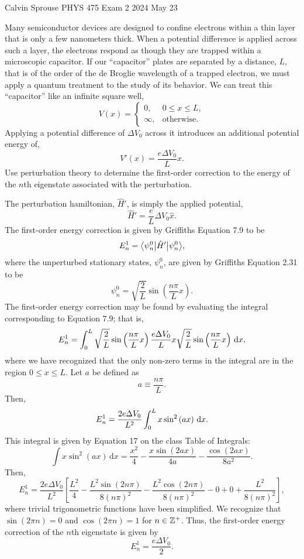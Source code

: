 \documentclass[a4paper, 12pt]{config/homework}
\begin{document}
\noindent
Calvin Sprouse \hfill PHYS 475 Exam 2 \hfill 2024 May 23
\bigskip

\noindent
Many semiconductor devices are designed to confine electrons within a thin layer that is only a few nanometers thick. When a potential difference is applied across such a layer, the electrons respond as though they are trapped within a microscopic capacitor. If our ``capacitor'' plates are separated by a distance, \(L\), that is of the order of the de Broglie wavelength of a trapped electron, we must apply a quantum treatment to the study of its behavior. We can treat this ``capacitor'' like an infinite square well,
\[V(x) = \begin{cases}
0, & 0 \le x \le L, \\
\infty, & \text{otherwise}.
\end{cases}\]
Applying a potential difference of \(\Delta V_0\) across it introduces an additional potential energy of,
\[V'(x) = \frac{e\Delta V_0}{L}x.\]
Use perturbation theory to determine the first-order correction to the energy of the \(n\)th eigenstate associated with the perturbation.

\bigskip\noindent
The perturbation hamiltonian, \(\hat{H}'\), is simply the applied potential,
\[\hat{H}' = \frac{e}{L}\Delta V_0 \hat{x}.\]
The first-order energy correction is given by Griffiths Equation 7.9 to be
\[E_n^1 = \bra*{\psi^0_n}\hat{H}'\ket*{\psi^0_n},\]
where the unperturbed stationary states, \(\psi_n^0\), are given by Griffiths Equation 2.31 to be
\[\psi_n^0 = \sqrt{\frac{2}{L}}\sin\left(\frac{n\pi}{L}x\right).\]
The first-order energy correction may be found by evaluating the integral corresponding to Equation 7.9; that is,
\[E_n^1 = \int_{0}^{L}{\sqrt{\frac{2}{L}}\sin\left(\frac{n\pi}{L}x\right) \frac{e\Delta V_0}{L}x \sqrt{\frac{2}{L}}\sin\left(\frac{n\pi}{L}x\right)\,\text{d}x},\]
where we have recognized that the only non-zero terms in the integral are in the region \(0\le x \le L\). Let \(a\) be defined as
\[a \equiv \frac{n\pi}{L}.\]
Then,
\[E_n^1 = \frac{2e\Delta V_0}{L^2} \int_{0}^{L}{x\sin^2\left(ax\right)\,\text{d}x}.\]
This integral is given by Equation 17 on the class Table of Integrals:
\[\int{x\sin^2\left(ax\right)\,\text{d}x} = \frac{x^2}{4} - \frac{x\sin(2ax)}{4a} - \frac{\cos(2ax)}{8a^2}.\]
Then,
\[E_n^1 = \frac{2e\Delta V_0}{L^2} \left[
\frac{L^2}{4} - \frac{L^2\sin\left(2n\pi\right)}{8(n\pi)^2} - \frac{L^2\cos\left(2n\pi\right)}{8(n\pi)^2} - 0 + 0 + \frac{L^2}{8\left(n\pi\right)^2}
\right],\]
where trivial trigonometric functions have been simplified. We recognize that \\ \(\sin(2\pi n) = 0\) and \(\cos(2\pi n) = 1\) for \(n\in\mathbb{Z}^+\). Thus, the first-order energy correction of the \(n\)th eigenstate is given by
\[E_n^1 = \frac{e\Delta V_0}{2}.\]
\end{document}
